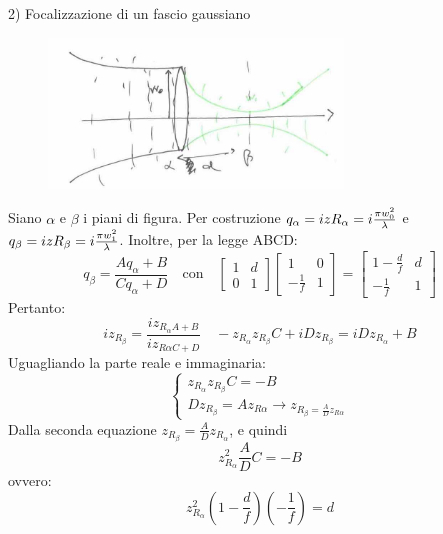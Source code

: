2) Focalizzazione di un fascio gaussiano
\begin{figure}[H]
\centering
\includegraphics[height=4cm]{images/3}
\end{figure}
Siano $\alpha$ e $\beta$ i piani di figura. Per costruzione $q_\alpha = izR_\alpha =i\frac{\pi w_0^2}{\lambda}$ e $q_\beta = izR_\beta = i\frac{\pi w_1^2}{\lambda}$.
Inoltre, per la legge ABCD:
\begin{equation*}
q_\beta = \frac{Aq_\alpha + B}{Cq_\alpha + D} \quad \text{con} \quad
\begin{bmatrix}
1	&	d\\
0	&	1
\end{bmatrix} \begin{bmatrix}
1	&	0\\
-\frac{1}{f}	&	1
\end{bmatrix}
=
\begin{bmatrix}
1-\frac{d}{f}	&	d\\
-\frac{1}{f}	&	1
\end{bmatrix}
\end{equation*}
Pertanto:
\begin{equation*}
iz_{R_\beta} = \frac{iz_{R_\alpha A + B}}{iz_{R\alpha C + D}}\quad -z_{R_\alpha} z_{R_\beta} C +iDz_{R_\beta} = iDz_{R_\alpha} + B
\end{equation*}
Uguagliando la parte reale e immaginaria:
\begin{equation*}
\begin{cases}
z_{R_\alpha} z_{R_\beta} C = -B\\
D z_{R_\beta} = A z_{R\alpha} \rightarrow z_{R_\beta = \frac{A}{D} z_{R\alpha}}
\end{cases}
\end{equation*}
Dalla seconda equazione $z_{R_\beta} = \frac{A}{D} z_{R_\alpha}$, e quindi
\begin{equation*}
z_{R_\alpha}^2 \frac{A}{D} C = -B
\end{equation*}
ovvero:
\begin{equation*}
z_{R_\alpha}^2 \left(1 - \frac{d}{f}\right) \left(-\frac{1}{f}\right) = d
\end{equation*}
